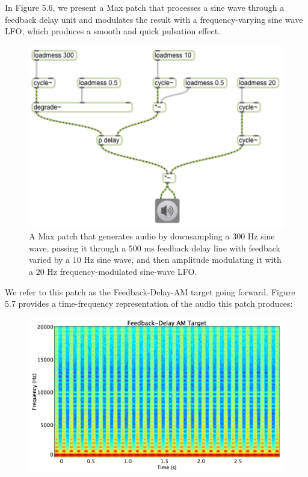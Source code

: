 \documentclass[a4paper,12pt]{report} 	%
\numberwithin{figure}{chapter}
\numberwithin{table}{chapter}
\numberwithin{equation}{chapter}
\begin{document}
\begin{flushleft}
In Figure 5.6, we present a Max patch that processes a sine wave through a feedback delay unit and modulates the result with a frequency-varying sine wave LFO, which produces a smooth and quick pulsation effect. 
\begin{figure}[h!]
\begin{center}
\includegraphics[scale=0.8]{DelayFeedbackAM}
\caption[Delay Feedback AM Max Patch]{A Max patch that generates audio by downsampling a $300$ Hz sine wave, passing it through a $500$ ms feedback delay line with feedback varied by a $10$ Hz sine wave, and then amplitude modulating it with a $20$ Hz frequency-modulated sine-wave LFO.}
\end{center}
\end{figure}
We refer to this patch as the Feedback-Delay-AM target going forward. Figure 5.7 provides a time-frequency representation of the audio this patch produces:
\begin{figure}[h!]
\begin{center}
\includegraphics[width=\linewidth]{FeedbackDelayAMTargetSTFT}

\end{center}
\end{figure}
\end{flushleft}
\end{document}
